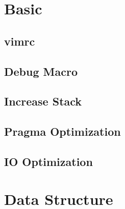 \documentclass[a4paper,10pt,twocolumn,oneside]{article}
\begin{document}
\pagestyle{fancy}
\fancyfoot{}
\fancyhead[R]{\thepage}
\renewcommand{\headrulewidth}{0.4pt}
\renewcommand{\contentsname}{Contents} 

\scriptsize
\vspace{-2em}
\tableofcontents
\vspace{-1em}



\newcommand{\includecode}[3][C++]{
  \subsection{#2}
  \vspace{-0.8em}
  
  \vspace{-1.2em}
}

\newcommand{\includetex}[2]{
  \subsection{#1}
  
  \vspace{-1.2em}
}

\newcommand{\sectiontitle}[1]{
  \section{#1}
  \vspace{-0.5em}
}



\sectiontitle{Basic}

\includecode[{}]{vimrc}{../codes/Basic/vimrc}
\includecode{Debug Macro}{../codes/Basic/debug.cpp}
\includecode{Increase Stack}{../codes/Basic/IncStack.cpp}
\includecode{Pragma Optimization}{../codes/Basic/Pragma.cpp}
% 
% 
\includecode{IO Optimization}{../codes/Basic/IOOptimize.cpp}


\sectiontitle{Data Structure}
\end{document}
